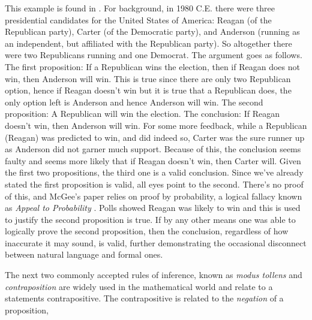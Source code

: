         \begin{example}
            This example is found in \cite{McGee1985ModusPonens}. For
            background, in 1980 C.E. there were three presidential candidates
            for the United States of America: Reagan (of the Republican party),
            Carter (of the Democratic party), and Anderson (running as an
            independent, but affiliated with the Republican party). So
            altogether there were two Republicans running and one Democrat. The
            argument goes as follows. The first proposition: If a Republican
            wins the election, then if Reagan does not win, then Anderson will
            win. This is true since there are only two Republican option, hence
            if Reagan doesn't win but it is true that a Republican does, the
            only option left is Anderson and hence Anderson will win. The second
            proposition: A Republican will win the election. The conclusion: If
            Reagan doesn't win, then Anderson will win. For some more feedback,
            while a Republican (Reagan) was predicted to win, and did indeed so,
            Carter was the sure runner up as Anderson did not garner much
            support. Because of this, the conclusion seems faulty and seems more
            likely that if Reagan doesn't win, then Carter will. Given the first
            two propositions, the third one is a valid conclusion. Since we've
            already stated the first proposition is valid, all eyes point to the
            second. There's no proof of this, and McGee's paper relies on proof
            by probability, a logical fallacy known as
            \textit{Appeal to Probability}%
            . Polls showed Reagan was likely to win
            and this is used to justify the second proposition is true. If by
            any other means one was able to logically prove the second
            proposition, then the conclusion, regardless of how inaccurate it
            may sound, is valid, further demonstrating the occasional disconnect
            between natural language and formal ones.
        \end{example}
        The next two commonly accepted rules of inference, known as
        \textit{modus tollens} and
        \textit{contraposition} are widely used
        in the mathematical world and relate to a statements contrapositive.
        The contrapositive is related to the \textit{negation} of a proposition,
